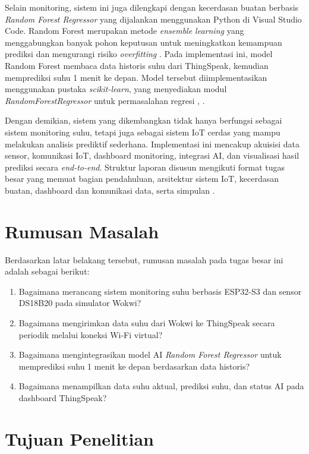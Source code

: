Selain monitoring, sistem ini juga dilengkapi dengan kecerdasan buatan
berbasis \textit{Random Forest Regressor} yang dijalankan menggunakan Python
di Visual Studio Code. Random Forest merupakan metode \textit{ensemble
learning} yang menggabungkan banyak pohon keputusan untuk meningkatkan
kemampuan prediksi dan mengurangi risiko \textit{overfitting}
\cite{breiman2001}. Pada implementasi ini, model Random Forest membaca data
historis suhu dari ThingSpeak, kemudian memprediksi suhu 1 menit ke depan.
Model tersebut diimplementasikan menggunakan pustaka \textit{scikit-learn},
yang menyediakan modul \textit{RandomForestRegressor} untuk permasalahan
regresi \cite{sklearn_rf}, \cite{pedregosa2011}.

Dengan demikian, sistem yang dikembangkan tidak hanya berfungsi sebagai
sistem monitoring suhu, tetapi juga sebagai sistem IoT cerdas yang mampu
melakukan analisis prediktif sederhana. Implementasi ini mencakup akuisisi
data sensor, komunikasi IoT, dashboard monitoring, integrasi AI, dan
visualisasi hasil prediksi secara \textit{end-to-end}. Struktur laporan
disusun mengikuti format tugas besar yang memuat bagian pendahuluan,
arsitektur sistem IoT, kecerdasan buatan, dashboard dan komunikasi data,
serta simpulan \cite{laporan_contoh}.

\section{Rumusan Masalah}

Berdasarkan latar belakang tersebut, rumusan masalah pada tugas besar ini
adalah sebagai berikut:

\begin{enumerate}
    \item Bagaimana merancang sistem monitoring suhu berbasis ESP32-S3 dan
    sensor DS18B20 pada simulator Wokwi?
    \item Bagaimana mengirimkan data suhu dari Wokwi ke ThingSpeak secara
    periodik melalui koneksi Wi-Fi virtual?
    \item Bagaimana mengintegrasikan model AI \textit{Random Forest Regressor}
    untuk memprediksi suhu 1 menit ke depan berdasarkan data historis?
    \item Bagaimana menampilkan data suhu aktual, prediksi suhu, dan status
    AI pada dashboard ThingSpeak?
\end{enumerate}

\section{Tujuan Penelitian}


